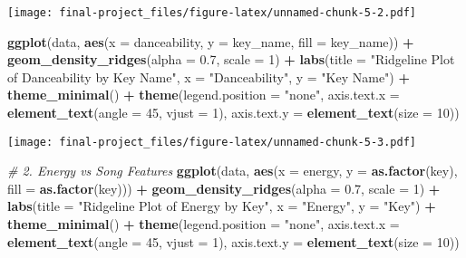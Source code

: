 \documentclass[
]{article}
\newenvironment{Shaded}{\begin{snugshade}}{\end{snugshade}}
\newcommand{\AttributeTok}[1]{\textcolor[rgb]{0.13,0.29,0.53}{#1}}
\newcommand{\CommentTok}[1]{\textcolor[rgb]{0.56,0.35,0.01}{\textit{#1}}}
\newcommand{\DecValTok}[1]{\textcolor[rgb]{0.00,0.00,0.81}{#1}}
\newcommand{\FloatTok}[1]{\textcolor[rgb]{0.00,0.00,0.81}{#1}}
\newcommand{\FunctionTok}[1]{\textcolor[rgb]{0.13,0.29,0.53}{\textbf{#1}}}
\newcommand{\NormalTok}[1]{#1}
\newcommand{\SpecialCharTok}[1]{\textcolor[rgb]{0.81,0.36,0.00}{\textbf{#1}}}
\newcommand{\StringTok}[1]{\textcolor[rgb]{0.31,0.60,0.02}{#1}}
\begin{document}
\texttt{[image: final-project\_files/figure-latex/unnamed-chunk-5-2.pdf]}

\begin{Shaded}
\begin{Highlighting}[]
\FunctionTok{ggplot}\NormalTok{(data, }\FunctionTok{aes}\NormalTok{(}\AttributeTok{x =}\NormalTok{ danceability, }\AttributeTok{y =}\NormalTok{ key\_name, }\AttributeTok{fill =}\NormalTok{ key\_name)) }\SpecialCharTok{+}
  \FunctionTok{geom\_density\_ridges}\NormalTok{(}\AttributeTok{alpha =} \FloatTok{0.7}\NormalTok{, }\AttributeTok{scale =} \DecValTok{1}\NormalTok{) }\SpecialCharTok{+}
  \FunctionTok{labs}\NormalTok{(}\AttributeTok{title =} \StringTok{"Ridgeline Plot of Danceability by Key Name"}\NormalTok{,}
       \AttributeTok{x =} \StringTok{"Danceability"}\NormalTok{,}
       \AttributeTok{y =} \StringTok{"Key Name"}\NormalTok{) }\SpecialCharTok{+}
  \FunctionTok{theme\_minimal}\NormalTok{() }\SpecialCharTok{+}
  \FunctionTok{theme}\NormalTok{(}\AttributeTok{legend.position =} \StringTok{"none"}\NormalTok{, }
        \AttributeTok{axis.text.x =} \FunctionTok{element\_text}\NormalTok{(}\AttributeTok{angle =} \DecValTok{45}\NormalTok{, }\AttributeTok{vjust =} \DecValTok{1}\NormalTok{),}
        \AttributeTok{axis.text.y =} \FunctionTok{element\_text}\NormalTok{(}\AttributeTok{size =} \DecValTok{10}\NormalTok{))}
\end{Highlighting}
\end{Shaded}

\texttt{[image: final-project\_files/figure-latex/unnamed-chunk-5-3.pdf]}

\begin{Shaded}
\begin{Highlighting}[]
\CommentTok{\# 2. Energy vs Song Features}
\FunctionTok{ggplot}\NormalTok{(data, }\FunctionTok{aes}\NormalTok{(}\AttributeTok{x =}\NormalTok{ energy, }\AttributeTok{y =} \FunctionTok{as.factor}\NormalTok{(key), }\AttributeTok{fill =} \FunctionTok{as.factor}\NormalTok{(key))) }\SpecialCharTok{+}
  \FunctionTok{geom\_density\_ridges}\NormalTok{(}\AttributeTok{alpha =} \FloatTok{0.7}\NormalTok{, }\AttributeTok{scale =} \DecValTok{1}\NormalTok{) }\SpecialCharTok{+}
  \FunctionTok{labs}\NormalTok{(}\AttributeTok{title =} \StringTok{"Ridgeline Plot of Energy by Key"}\NormalTok{,}
       \AttributeTok{x =} \StringTok{"Energy"}\NormalTok{,}
       \AttributeTok{y =} \StringTok{"Key"}\NormalTok{) }\SpecialCharTok{+}
  \FunctionTok{theme\_minimal}\NormalTok{() }\SpecialCharTok{+}
  \FunctionTok{theme}\NormalTok{(}\AttributeTok{legend.position =} \StringTok{"none"}\NormalTok{, }
        \AttributeTok{axis.text.x =} \FunctionTok{element\_text}\NormalTok{(}\AttributeTok{angle =} \DecValTok{45}\NormalTok{, }\AttributeTok{vjust =} \DecValTok{1}\NormalTok{),}
        \AttributeTok{axis.text.y =} \FunctionTok{element\_text}\NormalTok{(}\AttributeTok{size =} \DecValTok{10}\NormalTok{))}
\end{Highlighting}
\end{Shaded}
\end{document}
